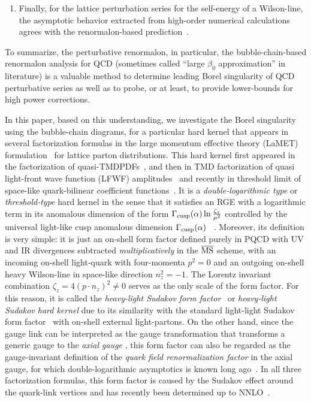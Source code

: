 \documentclass[a4paper,11pt]{article}
\begin{document}
\begin{enumerate}
    \item Finally, for the lattice perturbation series for the self-energy of a Wilson-line, the asymptotic behavior extracted from high-order numerical calculations agrees with the renormalon-based prediction~\cite{Bauer:2011ws,Bali:2014fea}. 
    \end{enumerate}
 To summarize, the perturbative renormalon, in particular, the bubble-chain-based renormalon analysis for QCD (sometimes called ``large $\beta_0$ approximation'' in literature) is a valuable method to determine leading Borel singularity of QCD perturbative series as well as to probe, or at least, to provide lower-bounds for high power corrections. 

In this paper, based on this understanding, we investigate the Borel singularity using the bubble-chain diagrams, for a particular hard kernel that appears in several factorization formulas in the large momentum effective theory (LaMET) formulation~\cite{Ji:2013dva,Ji:2014gla,Cichy:2018mum,Ji:2020ect} for lattice parton distributions. This hard kernel first appeared in the factorization of quasi-TMDPDFs~\cite{Ji:2014hxa,Ebert:2019okf,Ji:2019ewn,Vladimirov:2020ofp,Ebert:2020gxr,Ebert:2022fmh}, and then in TMD factorization of quasi light-front wave function (LFWF) amplitudes~\cite{Ji:2021znw} and recently in threshold limit of space-like quark-bilinear coefficient functions~\cite{Ji:2023pba}. It is a {\it double-logarithmic type} or {\it threshold-type} hard kernel in the sense that it satisfies an RGE with a logarithmic term in its anomalous dimension of the form $\Gamma_{\rm cusp}(\alpha)\ln \frac{\zeta_z}{\mu^2}$ controlled by the universal light-like cusp anomalous dimension $\Gamma_{\rm cusp}(\alpha)$~\cite{Korchemsky:1987wg,Henn:2019swt,vonManteuffel:2020vjv} . Moreover, its definition is very simple: it is just an on-shell form factor defined purely in PQCD with UV and IR divergences subtracted {\it multiplicatively} in the $\overline {\rm MS}$ scheme, with an incoming on-shell light-quark with four-momenta $p^2=0$ and an outgoing on-shell heavy Wilson-line in space-like direction $n_z^2=-1$. The Lorentz invariant combination $\zeta_z=4(p\cdot n_z)^2 \ne 0$ serves as the only scale of the form factor. For this reason, it is called the {\it heavy-light Sudakov form factor}~\cite{Ji:2023pba} or {\it heavy-light Sudakov hard kernel} due to its similarity with the standard light-light Sudakov form factor~\cite{Sudakov:1954sw,Collins:1989bt,Moch:2005id,Baikov:2009bg} with on-shell external light-partons. On the other hand, since the gauge link can be interpreted as the gauge transformation that transforms a generic gauge to the {\it axial gauge} , this form factor can also be regarded as the gauge-invariant definition of the {\it quark field renormalization factor} in the axial gauge, for which double-logarithmic asymptotics is known long ago~\cite{Sen:1981sd}.  In all three factorization formulas, this form factor is caused by the Sudakov effect around the quark-link vertices and has recently been determined up to NNLO~\cite{Ji:2023pba,delRio:2023pse}. 
\end{document}
